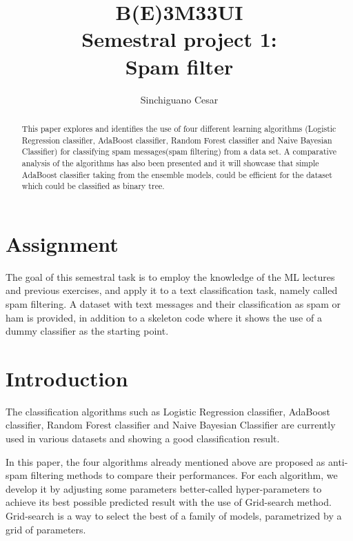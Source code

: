 \documentclass[journal]{IEEEtran}
\begin{document}
%
\title{B(E)3M33UI\\ Semestral project 1:\\Spam filter}
\author{Sinchiguano Cesar}


\maketitle

\begin{abstract}
This paper explores and identifies the use of four different learning algorithms (Logistic Regression classifier, AdaBoost classifier, Random Forest classifier and Naive Bayesian Classifier) for classifying spam messages(spam filtering) from a data set. A comparative analysis of the algorithms has also been presented and it will showcase that simple AdaBoost classifier taking from the ensemble models, could
be efficient for the dataset which could be classified as binary tree.
\end{abstract}


\section{Assignment}
The goal of this semestral task is to employ the knowledge of the ML lectures and previous exercises, and apply it to a text classification task, namely called spam filtering. A dataset with text
messages and their classification as spam or ham is provided, in addition to a skeleton code where it shows the use of a dummy classifier as the starting point. 

\section{Introduction}

The classification algorithms such as Logistic Regression classifier, AdaBoost classifier, Random Forest classifier and Naive Bayesian Classifier are currently used in various datasets and
showing a good classification result.

In this paper, the four algorithms already mentioned above are proposed as anti-spam filtering methods to compare their performances. For each algorithm, we develop it by adjusting some parameters better-called hyper-parameters to achieve its best possible predicted result with the use of Grid-search method.
Grid-search is a way to select the best of a family of models, parametrized by a grid of parameters. 
\end{document}
